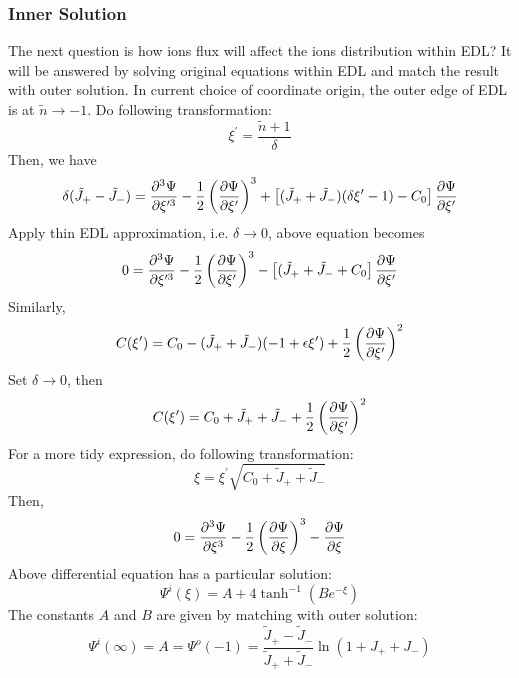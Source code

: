 \documentclass[fontsize=11pt, %
                             paper=a4, %
                             twoside, %
                             captions=tableheading,
                             index=totoc,
                             hyperref]{labbook}
\begin{document}
\begin{addmargin}[4cm]{0cm}
\subsubsection{Inner Solution}
The next question is how ions flux will affect the ions distribution within EDL? It will be answered by solving original equations within EDL and match the result with outer solution. In current choice of coordinate origin, the outer edge of EDL is at $\tilde n \to -1$. Do following transformation:
\begin{equation}
\xi^\prime=\frac{\tilde n +1}{\delta}
\end{equation}
Then, we have
\begin{equation}
\delta(\tilde J_+ - \tilde J_-)=\frac{\partial^3 \Psi}{\partial \xi^{\prime3}}-\frac{1}{2}\left(\frac{\partial \Psi}{\partial \xi^\prime}\right)^3+\left[(\tilde J_+ + \tilde J_-)(\delta\xi^\prime -1)-C_0\right]\frac{\partial \Psi}{\partial \xi^\prime}
\end{equation}
Apply thin EDL approximation, i.e. $\delta \to 0$, above equation becomes
\begin{equation}
0=\frac{\partial^3 \Psi}{\partial \xi^{\prime3}}-\frac{1}{2}\left(\frac{\partial \Psi}{\partial \xi^\prime}\right)^3-\left[(\tilde J_+ + \tilde J_-+C_0\right]\frac{\partial \Psi}{\partial \xi^\prime}
\end{equation}
Similarly,
\begin{equation}
C(\xi^\prime)=C_0-(\tilde J_+ + \tilde J_-)(-1 + \epsilon \xi^\prime) + \frac{1}{2}\left(\frac{\partial \Psi}{\partial \xi^\prime}\right)^2
\end{equation}
Set $\delta \to 0$, then
\begin{equation}
C(\xi^\prime)=C_0+\tilde J_+ + \tilde J_- + \frac{1}{2}\left(\frac{\partial \Psi}{\partial \xi^\prime}\right)^2
\end{equation}
For a more tidy expression, do following transformation:
\begin{equation}
\xi=\xi^\prime \sqrt{C_0+\tilde J_+ + \tilde J_-}
\end{equation}
Then,
\begin{equation}
0=\frac{\partial^3 \Psi}{\partial \xi^{3}}-\frac{1}{2}\left(\frac{\partial \Psi}{\partial \xi}\right)^3-\frac{\partial \Psi}{\partial \xi}
\end{equation}
Above differential equation has a particular solution:
\begin{equation}
\Psi^i(\xi)=A+4 \tanh^{-1}(B e^{-\xi})
\end{equation}
The constants $A$ and $B$ are given by matching with outer solution:
\begin{equation}
\Psi^i(\infty)=A=\Psi^o(-1)=\frac{\tilde J_+ - \tilde J_-}{\tilde J_+ + \tilde J_-}\ln (1+J_++J_-)

\end{equation}
\end{addmargin}
\end{document}

